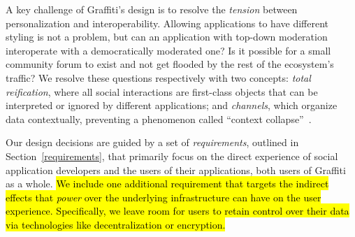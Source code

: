 


A key challenge of Graffiti's design is to resolve
the \emph{tension} between personalization and interoperability.
Allowing applications to have different styling is
not a problem, but can an application with top-down
moderation interoperate with a democratically moderated one?
Is it possible for a small community forum to exist and
not get flooded by the rest of the ecosystem's traffic?
We resolve these questions respectively with two concepts: \emph{total reification},
where all social interactions
are first-class objects that
can be interpreted or ignored by different applications;
and \emph{channels}, which organize data contextually,
preventing a phenomenon called ``context collapse''~\cite{contextcollapse}.


Our design decisions are guided by a set of \emph{requirements}, outlined
in Section~\ref{requirements}, that primarily focus on the direct experience
of social application developers and the users of their applications,
both users of Graffiti as a whole.
\hl{%
We include one additional requirement that targets the indirect
effects that \emph{power} over the underlying infrastructure
can have on the user experience.
Specifically, we leave room for users to retain control over their data
via technologies like decentralization or encryption.
}%


